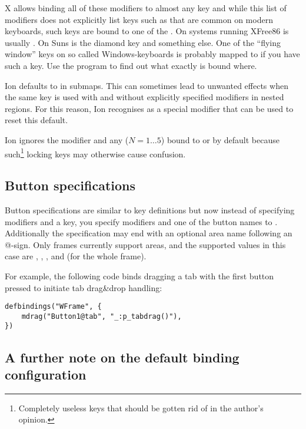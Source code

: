 X allows binding all of these modifiers to almost any key and while this
list of modifiers does not explicitly list keys such as 
 that are common on modern keyboards, such
keys are bound to one of the . On systems running XFree86
 is usually . On Suns  is the diamond key
and  something else. One of the ``flying window'' keys on so
called Windows-keyboards is probably mapped to  if you have
such a key. Use the program 
to find out what exactly is bound where. 

Ion defaults to  in submaps. This can sometimes lead to
unwanted effects when the same key is used with and without explicitly
specified modifiers in nested regions. For this reason, Ion recognises
 as a special modifier that can be used to reset this
default.

Ion ignores the  modifier and any  ($N=1{\ldots} 5$)
bound to  or
by default because such\footnote{Completely useless keys that should be
gotten rid of in the author's opinion.} locking keys may otherwise
cause confusion.


\subsection{Button specifications}

Button specifications are similar to key definitions but now
instead of specifying modifiers and a key, you specify modifiers
and one of the button names  to
. Additionally the
specification may end with an optional area name following an @-sign.
Only frames currently support areas, and the supported values in this
case are
, , ,  and
 (for the whole frame).

For example, the following code binds dragging a tab with the first 
button pressed to initiate tab drag\&drop handling:

\begin{verbatim}
defbindings("WFrame", {
    mdrag("Button1@tab", "_:p_tabdrag()"),
})
\end{verbatim}


\subsection{A further note on the default binding configuration}

